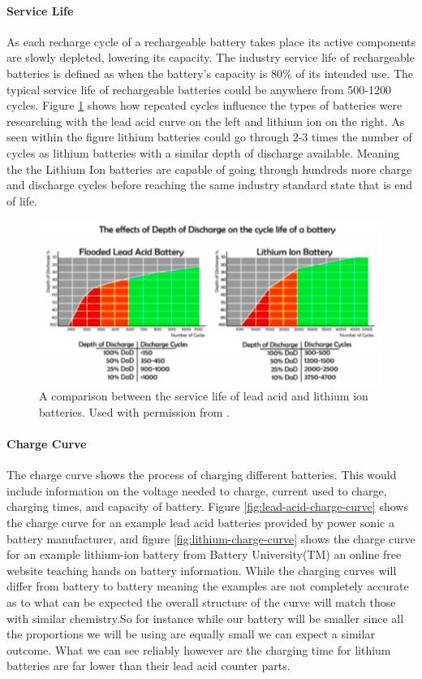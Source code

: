 \paragraph{Service Life}
As each recharge cycle of a rechargeable battery takes place its active components are slowly depleted, lowering its capacity. The industry service life of rechargeable batteries is defined as when the battery's capacity is 80\% of its intended use. The typical service life of rechargeable batteries could be anywhere from 500-1200 cycles. Figure \ref{fig:service-life} shows how repeated cycles influence the types of batteries were researching with the lead acid curve on the left and lithium ion on the right. As seen within the figure lithium batteries could go through 2-3 times the number of cycles as lithium batteries with a similar depth of discharge available. Meaning the the Lithium Ion batteries are capable of going through hundreds more charge and discharge cycles before reaching the same industry standard state that is end of life.
\cite{Lithium-Ion-Battery-Vs-Lead-acid-battery}
\begin{figure}
    \centering
    \includegraphics[scale=0.5]{figures/service life.png}
    \caption{A comparison between the service life of lead acid and lithium ion batteries. Used with permission from \cite{serv-life-ref}.}
    \label{fig:service-life} 
\end{figure}

\paragraph{Charge Curve}
The charge curve shows the process of charging different batteries. This would include information on the voltage needed to charge, current used to charge, charging times, and capacity of battery. Figure \ref{fig:lead-acid-charge-curve} shows the charge curve for an example lead acid batteries provided by power sonic a battery manufacturer, and figure \ref{fig:lithium-charge-curve} shows the charge curve for an example lithium-ion battery from Battery University(TM) an online free website teaching hands on battery information. While the charging curves will differ from battery to battery meaning the examples are not completely accurate as to what can be expected the overall structure of the curve will match those with similar chemistry.So for instance while our battery will be smaller since all the proportions we will be using are equally small we can expect a similar outcome. What we can see reliably however are the charging time for lithium batteries are far lower than their lead acid counter parts.

